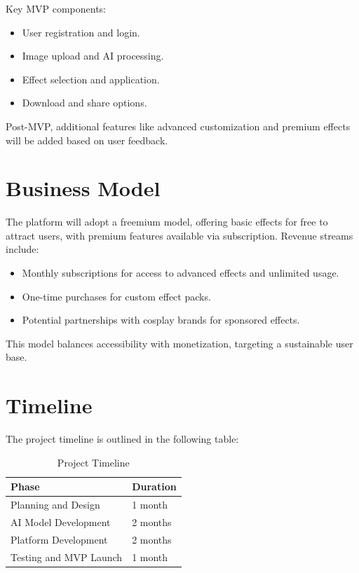 \documentclass[12pt]{article}
\begin{document}
Key MVP components:
\begin{itemize}
    \item User registration and login.
    \item Image upload and AI processing.
    \item Effect selection and application.
    \item Download and share options.
\end{itemize}

Post-MVP, additional features like advanced customization and premium effects will be added based on user feedback.

\section{Business Model}

The platform will adopt a freemium model, offering basic effects for free to attract users, with premium features available via subscription. Revenue streams include:

\begin{itemize}
    \item Monthly subscriptions for access to advanced effects and unlimited usage.
    \item One-time purchases for custom effect packs.
    \item Potential partnerships with cosplay brands for sponsored effects.
\end{itemize}

This model balances accessibility with monetization, targeting a sustainable user base.

\section{Timeline}

The project timeline is outlined in the following table:

\begin{table}[h]
\centering
\begin{tabular}{|l|l|}
\hline
\textbf{Phase} & \textbf{Duration} \\
\hline
Planning and Design & 1 month \\
\hline
AI Model Development & 2 months \\
\hline
Platform Development & 2 months \\
\hline
Testing and MVP Launch & 1 month \\
\hline
\end{tabular}
\caption{Project Timeline}
\end{table}
\end{document}
